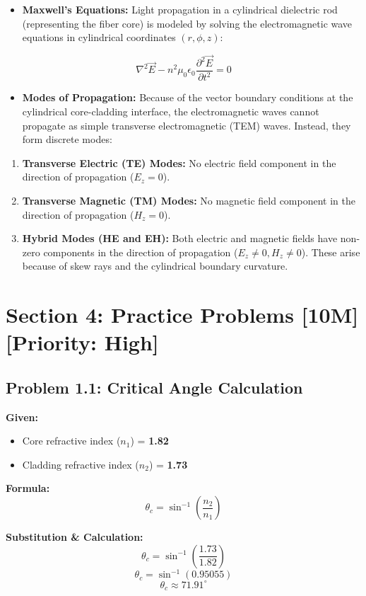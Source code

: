 \begin{itemize}
  \item   \textbf{Maxwell's Equations:} Light propagation in a cylindrical dielectric rod (representing the fiber core) is modeled by solving the electromagnetic wave equations in cylindrical coordinates $(r, \phi, z)$:
\end{itemize}
    \[ \nabla^2 \vec{E} - n^2 \mu_0 \epsilon_0 \frac{\partial^2 \vec{E}}{\partial t^2} = 0 \]
\begin{itemize}
  \item   \textbf{Modes of Propagation:} Because of the vector boundary conditions at the cylindrical core-cladding interface, the electromagnetic waves cannot propagate as simple transverse electromagnetic (TEM) waves. Instead, they form discrete modes:
\end{itemize}
\begin{enumerate}
  \item \textbf{Transverse Electric (TE) Modes:} No electric field component in the direction of propagation ($E_z = 0$).
  \item \textbf{Transverse Magnetic (TM) Modes:} No magnetic field component in the direction of propagation ($H_z = 0$).
  \item \textbf{Hybrid Modes (HE and EH):} Both electric and magnetic fields have non-zero components in the direction of propagation ($E_z \neq 0, H_z \neq 0$). These arise because of skew rays and the cylindrical boundary curvature.
\end{enumerate}


\section{Section 4: Practice Problems [10M] [Priority: High]}

\subsection{Problem 1.1: Critical Angle Calculation}
\textbf{Given:}
\begin{itemize}
  \item   Core refractive index ($n_1$) = \textbf{1.82}
  \item   Cladding refractive index ($n_2$) = \textbf{1.73}
\end{itemize}

\textbf{Formula:}
\[ \theta_c = \sin^{-1}\left(\frac{n_2}{n_1}\right) \]

\textbf{Substitution \& Calculation:}
\[ \theta_c = \sin^{-1}\left(\frac{1.73}{1.82}\right) \]
\[ \theta_c = \sin^{-1}(0.95055) \]
\[ \theta_c \approx 71.91^\circ \]


